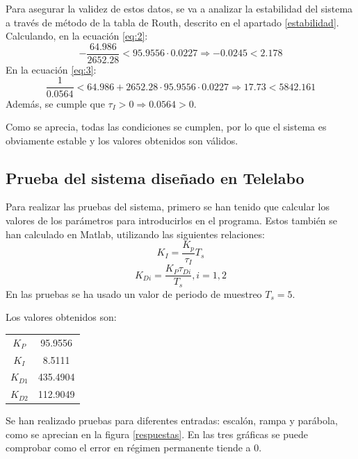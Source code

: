 \documentclass[a4paper]{article}
\begin{document}
Para asegurar la validez de estos datos, se va a analizar la estabilidad del sistema a través de método de la tabla de Routh, descrito en el apartado \ref{estabilidad}.
Calculando, en la ecuación \ref{eq:2}:
\begin{equation}
	-\frac{64.986}{2652.28}< 95.9556\cdot0.0227 \Rightarrow
	-0.0245<2.178
\end{equation}
En la ecuación \ref{eq:3}:
\begin{equation}
	\frac{1}{0.0564} < 64.986+2652.28\cdot95.9556\cdot0.0227 \Rightarrow
	17.73<5842.161
\end{equation}
Además, se cumple que $\tau_I > 0 \Rightarrow 0.0564>0$.

Como se aprecia, todas las condiciones se cumplen, por lo que el sistema es obviamente estable y los valores obtenidos son válidos.

\subsection{Prueba del sistema diseñado en Telelabo \label{sec:pruebas}}
Para realizar las pruebas del sistema, primero se han tenido que calcular los valores de los parámetros para introducirlos en el programa. Estos también se han calculado en Matlab, utilizando las siguientes relaciones:
\begin{equation}
K_I=\frac{K_p}{\tau_I} T_s
\end{equation}
\begin{equation}
K_{Di}=\frac{K_P \tau_{Di}}{T_s}, i=1,2
\end{equation}
En las pruebas se ha usado un valor de periodo de muestreo $T_s=5$.

Los valores obtenidos son:
\begin{center}
	\begin{tabular}{c|c}
		$K_P$ & 95.9556 \\
		$K_I$ & 8.5111 \\
		$K_{D1}$ & 435.4904 \\
		$K_{D2}$ & 112.9049 \\
	\end{tabular}
\end{center}

Se han realizado pruebas para diferentes entradas: escalón, rampa y parábola, como se aprecian en la figura \ref{respuestas}.
En las tres gráficas se puede comprobar como el error en régimen permanente tiende a $0$.
\end{document}
